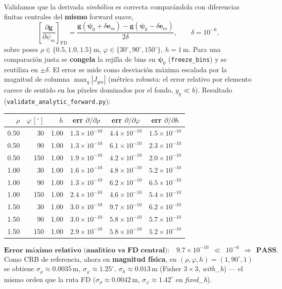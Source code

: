 \documentclass[11pt,a4paper]{article}
\theoremstyle{plain}
\theoremstyle{definition}
\newcommand{\vect}[1]{\boldsymbol{#1}}
\begin{document}
Validamos que la derivada \emph{simb\'olica} es correcta compar\'andola con
diferencias finitas centrales del \textbf{mismo} forward suave,
\begin{equation}
    \left[\frac{\partial\vect{g}}{\partial\psi_m}\right]_{\mathrm{FD}}
    =\frac{\vect{g}(\vect{\psi}_0+\delta\vect{e}_m)-\vect{g}(\vect{\psi}_0-\delta\vect{e}_m)}{2\delta},
    \qquad \delta=10^{-6},
    \label{eq:fd}
\end{equation}
sobre poses $\rho\in\{0.5,1.0,1.5\}$\,m,
$\varphi\in\{30^\circ,90^\circ,150^\circ\}$, $h=1$\,m. Para una comparaci\'on
justa se \textbf{congela} la rejilla de bins en $\vect{\psi}_0$
(\texttt{freeze\_bins}) y se reutiliza en $\pm\delta$. El error se mide como
desviaci\'on m\'axima escalada por la magnitud de columna $\max_q|J_{qm}|$
(m\'etrica robusta: el error relativo por elemento carece de sentido en los
p\'ixeles dominados por el fondo, $y_q\ll b$). Resultado
(\texttt{validate\_analytic\_forward.py}):
\begin{center}
\small
\begin{tabular}{@{}rrr|ccc@{}}
\toprule
$\rho$ & $\varphi\,[^\circ]$ & $h$ & err $\partial/\partial\rho$ & err $\partial/\partial\varphi$ & err $\partial/\partial h$ \\
\midrule
0.50 &  30 & 1.00 & $1.3\times10^{-10}$ & $4.4\times10^{-10}$ & $1.5\times10^{-10}$ \\
0.50 &  90 & 1.00 & $1.3\times10^{-10}$ & $6.1\times10^{-10}$ & $2.3\times10^{-10}$ \\
0.50 & 150 & 1.00 & $1.9\times10^{-10}$ & $4.2\times10^{-10}$ & $2.0\times10^{-10}$ \\
1.00 &  30 & 1.00 & $1.6\times10^{-10}$ & $4.8\times10^{-10}$ & $5.2\times10^{-10}$ \\
1.00 &  90 & 1.00 & $1.3\times10^{-10}$ & $6.2\times10^{-10}$ & $6.5\times10^{-10}$ \\
1.00 & 150 & 1.00 & $2.4\times10^{-10}$ & $4.6\times10^{-10}$ & $5.4\times10^{-10}$ \\
1.50 &  30 & 1.00 & $3.0\times10^{-10}$ & $9.7\times10^{-10}$ & $6.2\times10^{-10}$ \\
1.50 &  90 & 1.00 & $3.0\times10^{-10}$ & $5.8\times10^{-10}$ & $5.7\times10^{-10}$ \\
1.50 & 150 & 1.00 & $2.9\times10^{-10}$ & $5.8\times10^{-10}$ & $5.2\times10^{-10}$ \\
\bottomrule
\end{tabular}
\end{center}
\begin{equation*}
    \textbf{Error m\'aximo relativo (anal\'itico vs FD central):}\quad
    9.7\times10^{-10}\ \ \ll\ \ 10^{-6}\ \ \Rightarrow\ \ \textbf{PASS}.
\end{equation*}
Como CRB de referencia, ahora en \textbf{magnitud f\'isica}, en
$(\rho,\varphi,h)=(1,90^\circ,1)$ se obtiene $\sigma_\rho\approx0.0035$\,m,
$\sigma_\varphi\approx1.25^\circ$, $\sigma_h\approx0.013$\,m (Fisher $3\times3$,
\emph{with\_h}) --- el mismo orden que la ruta FD ($\sigma_\rho\approx0.0042$\,m,
$\sigma_\varphi\approx1.42^\circ$ en \emph{fixed\_h}).
\end{document}
